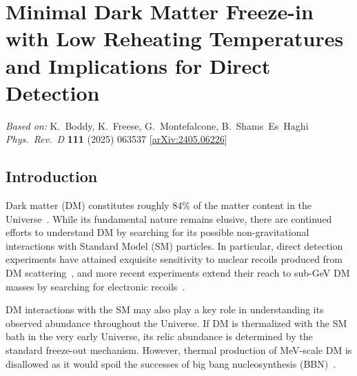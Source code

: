 \chapter[Minimal Dark Matter Freeze-in with Low Reheating Temperatures]{Minimal Dark Matter Freeze-in with Low Reheating Temperatures and Implications for Direct Detection}
\label{ch:minimal-dm-freezein}

\begin{center}
\textit{Based on:} K.~Boddy, K.~Freese, G.~Montefalcone, B.~Shams~Es~Haghi\\
\textit{Phys.\ Rev.\ D} \textbf{111} (2025) 063537
[\href{https://arxiv.org/abs/2405.06226}{arXiv:2405.06226}]
\end{center}
\vspace{1em}

\section{Introduction}
\label{sec:ch8-intro}

Dark matter (DM) constitutes roughly 84\% of  the matter content in the Universe~\cite{Planck:2018vyg}. While its fundamental nature remains elusive, there are continued efforts to understand DM by searching for its possible non-gravitational interactions with Standard Model (SM) particles. In particular, direct detection experiments have attained exquisite sensitivity to nuclear recoils produced from DM scattering~\cite{PandaX-II:2017hlx,XENON:2018voc,Hambye:2018dpi,LZ:2022lsv}, and more recent experiments extend their reach to sub-GeV DM masses by searching for electronic recoils~\cite{PandaX-II:2017hlx,PandaX:2022xqx,DAMIC-M:2023gxo,DAMIC-M:2023hgj,SENSEI:2020dpa,DarkSide:2022knj,XENON:2018voc}.

DM interactions with the SM may also play a key role in understanding its observed abundance throughout the Universe. If DM is thermalized with the SM bath in the very early Universe, its relic abundance is determined by the standard freeze-out mechanism. However, thermal production of MeV-scale DM is disallowed as it would spoil the successes of big bang nucleosynthesis (BBN)~\cite{Boehm:2013jpa,Nollett:2013pwa,Steigman:2014pfa,An:2022sva}.

